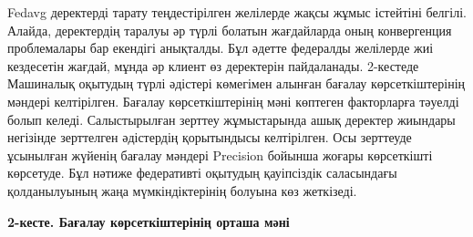 
Fedavg деректерді тарату теңдестірілген желілерде жақсы жұмыс істейтіні
белгілі. Алайда, деректердің таралуы әр түрлі болатын жағдайларда оның
конвергенция проблемалары бар екендігі анықталды. Бұл әдетте федералды
желілерде жиі кездесетін жағдай, мұнда әр клиент өз деректерін
пайдаланады. 2-кестеде Машиналық оқытудың түрлі әдістері көмегімен
алынған бағалау көрсеткіштерінің мәндері келтірілген. Бағалау
көрсеткіштерінің мәні көптеген факторларға тәуелді болып келеді.
Салыстырылған зерттеу жұмыстарында ашық деректер жиындары негізінде
зерттелген әдістердің қорытындысы келтірілген. Осы зерттеуде ұсынылған
жүйенің бағалау мәндері Precision бойынша жоғары көрсеткішті көрсетуде.
Бұл нәтиже федеративті оқытудың қауіпсіздік саласындағы қолданылуының
жаңа мүмкіндіктерінің болуына көз жеткізеді.

{\bfseries 2-кесте. Бағалау көрсеткіштерінің орташа мәні}

